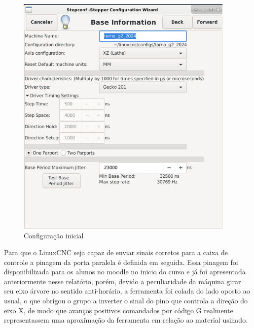 \begin{figure}[H]
    \begin{center}
        \includegraphics[width=0.95\textwidth]{images/prog/stepconf1.png}
    \end{center}
    \caption{Configuração inicial}\label{step1}
\end{figure}

Para que o LinuxCNC seja capaz de enviar sinais corretos para a caixa de controle a pinagem da porta paralela é definida em seguida. Essa pinagem foi disponibilizada para os alunos no moodle no inicio do curso e já foi apresentada anteriormente nesse relatório, porém, devido a peculiaridade da máquina girar seu eixo árvore no sentido anti-horário, a ferramenta foi colada do lado oposto ao usual, o que obrigou o grupo a inverter o sinal do pino que controla a direção do eixo X, de modo que avanços positivos comandados por código G realmente representassem uma aproximação da ferramenta em relação ao material usinado.


